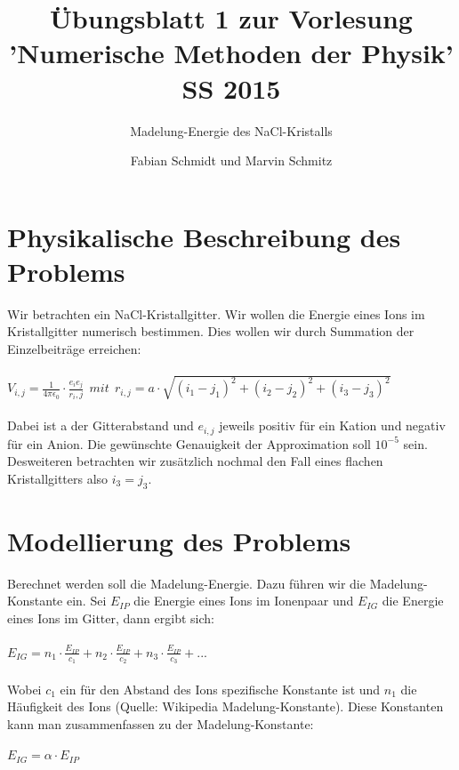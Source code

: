 \documentclass[ngerman]{scrartcl}
\begin{document}
\title{Übungsblatt 1 zur Vorlesung 'Numerische Methoden der Physik' SS 2015}
\subtitle{Madelung-Energie des NaCl-Kristalls}
\author{Fabian Schmidt und Marvin Schmitz}
\maketitle

\newpage

\section*{Physikalische Beschreibung des Problems}

Wir betrachten ein NaCl-Kristallgitter. Wir wollen die Energie eines Ions im Kristallgitter numerisch bestimmen.
Dies wollen wir durch Summation der Einzelbeiträge erreichen: \\ \\
$ V_{i,j} = \frac{1}{4\pi \epsilon_0} \cdot \frac{e_ie_j}{r_i,j}\ \ mit\ \ r_{i,j} = a\cdot \sqrt{(i_1-j_1)^2+(i_2-j_2)^2+(i_3-j_3)^2} $\\ \\
Dabei ist a der Gitterabstand und $e_{i,j}$ jeweils positiv für ein Kation und negativ für ein Anion. Die gewünschte Genauigkeit der Approximation soll $10^{-5}$ sein. Desweiteren betrachten wir zusätzlich nochmal den Fall eines flachen Kristallgitters also $i_3=j_3$.

\section*{Modellierung des Problems}

Berechnet werden soll die Madelung-Energie. Dazu führen wir die Madelung-Konstante ein. Sei $E_{IP}$ die Energie eines Ions im Ionenpaar und $E_{IG}$ die Energie eines Ions im Gitter, dann ergibt sich:\\ \\
$ E_{IG} = n_1 \cdot \frac{E_{IP}}{c_1} + n_2\cdot \frac{E_{IP}}{c_2} + n_3\cdot \frac{E_{IP}}{c_3} + ... $ \\ \\
Wobei $c_1$ ein für den Abstand des Ions spezifische Konstante ist und $n_1$ die Häufigkeit des Ions (Quelle: Wikipedia Madelung-Konstante). Diese Konstanten kann man zusammenfassen zu der Madelung-Konstante:\\ \\
$ E_{IG} = \alpha \cdot E_{IP} $ 
\end{document}
